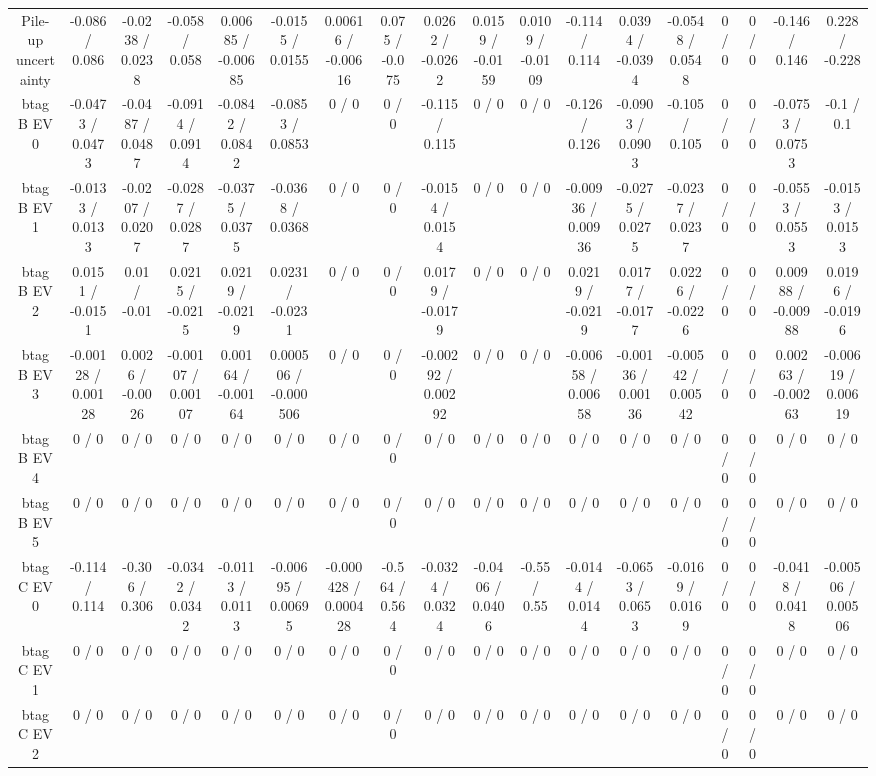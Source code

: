 \documentclass[10pt]{article}
\begin{document}
\begin{table}[htbp]
\begin{center}
\begin{tabular}{|c|c|c|c|c|c|c|c|c|c|c|c|c|c|c|c|c|c|}
  Pile-up uncertainty & -0.086 / 0.086 & -0.0238 / 0.0238 & -0.058 / 0.058 & 0.00685 / -0.00685 & -0.0155 / 0.0155 & 0.00616 / -0.00616 & 0.075 / -0.075 & 0.0262 / -0.0262 & 0.0159 / -0.0159 & 0.0109 / -0.0109 & -0.114 / 0.114 & 0.0394 / -0.0394 & -0.0548 / 0.0548 & 0 / 0 & 0 / 0 & -0.146 / 0.146 & 0.228 / -0.228 \\ 
  btag B EV 0 & -0.0473 / 0.0473 & -0.0487 / 0.0487 & -0.0914 / 0.0914 & -0.0842 / 0.0842 & -0.0853 / 0.0853 & 0 / 0 & 0 / 0 & -0.115 / 0.115 & 0 / 0 & 0 / 0 & -0.126 / 0.126 & -0.0903 / 0.0903 & -0.105 / 0.105 & 0 / 0 & 0 / 0 & -0.0753 / 0.0753 & -0.1 / 0.1 \\ 
  btag B EV 1 & -0.0133 / 0.0133 & -0.0207 / 0.0207 & -0.0287 / 0.0287 & -0.0375 / 0.0375 & -0.0368 / 0.0368 & 0 / 0 & 0 / 0 & -0.0154 / 0.0154 & 0 / 0 & 0 / 0 & -0.00936 / 0.00936 & -0.0275 / 0.0275 & -0.0237 / 0.0237 & 0 / 0 & 0 / 0 & -0.0553 / 0.0553 & -0.0153 / 0.0153 \\ 
  btag B EV 2 & 0.0151 / -0.0151 & 0.01 / -0.01 & 0.0215 / -0.0215 & 0.0219 / -0.0219 & 0.0231 / -0.0231 & 0 / 0 & 0 / 0 & 0.0179 / -0.0179 & 0 / 0 & 0 / 0 & 0.0219 / -0.0219 & 0.0177 / -0.0177 & 0.0226 / -0.0226 & 0 / 0 & 0 / 0 & 0.00988 / -0.00988 & 0.0196 / -0.0196 \\ 
  btag B EV 3 & -0.00128 / 0.00128 & 0.0026 / -0.0026 & -0.00107 / 0.00107 & 0.00164 / -0.00164 & 0.000506 / -0.000506 & 0 / 0 & 0 / 0 & -0.00292 / 0.00292 & 0 / 0 & 0 / 0 & -0.00658 / 0.00658 & -0.00136 / 0.00136 & -0.00542 / 0.00542 & 0 / 0 & 0 / 0 & 0.00263 / -0.00263 & -0.00619 / 0.00619 \\ 
  btag B EV 4 & 0 / 0 & 0 / 0 & 0 / 0 & 0 / 0 & 0 / 0 & 0 / 0 & 0 / 0 & 0 / 0 & 0 / 0 & 0 / 0 & 0 / 0 & 0 / 0 & 0 / 0 & 0 / 0 & 0 / 0 & 0 / 0 & 0 / 0 \\ 
  btag B EV 5 & 0 / 0 & 0 / 0 & 0 / 0 & 0 / 0 & 0 / 0 & 0 / 0 & 0 / 0 & 0 / 0 & 0 / 0 & 0 / 0 & 0 / 0 & 0 / 0 & 0 / 0 & 0 / 0 & 0 / 0 & 0 / 0 & 0 / 0 \\ 
  btag C EV 0 & -0.114 / 0.114 & -0.306 / 0.306 & -0.0342 / 0.0342 & -0.0113 / 0.0113 & -0.00695 / 0.00695 & -0.000428 / 0.000428 & -0.564 / 0.564 & -0.0324 / 0.0324 & -0.0406 / 0.0406 & -0.55 / 0.55 & -0.0144 / 0.0144 & -0.0653 / 0.0653 & -0.0169 / 0.0169 & 0 / 0 & 0 / 0 & -0.0418 / 0.0418 & -0.00506 / 0.00506 \\ 
  btag C EV 1 & 0 / 0 & 0 / 0 & 0 / 0 & 0 / 0 & 0 / 0 & 0 / 0 & 0 / 0 & 0 / 0 & 0 / 0 & 0 / 0 & 0 / 0 & 0 / 0 & 0 / 0 & 0 / 0 & 0 / 0 & 0 / 0 & 0 / 0 \\ 
  btag C EV 2 & 0 / 0 & 0 / 0 & 0 / 0 & 0 / 0 & 0 / 0 & 0 / 0 & 0 / 0 & 0 / 0 & 0 / 0 & 0 / 0 & 0 / 0 & 0 / 0 & 0 / 0 & 0 / 0 & 0 / 0 & 0 / 0 & 0 / 0 \\ 

\end{tabular}
\end{center}
\end{table}
\end{document}
